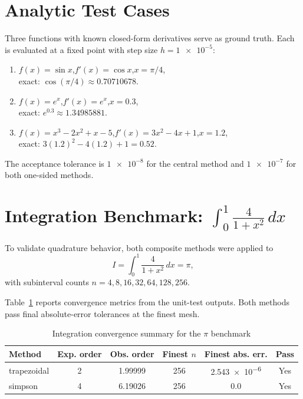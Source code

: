 \documentclass[letterpaper,twocolumn,fleqn]{article}
\begin{document}
\section{Analytic Test Cases}
Three functions with known closed-form derivatives serve as ground truth. Each is evaluated at a fixed point with step size $h=\num{1e-5}$:

\begin{enumerate}
    \item $f(x)=\sin x$,\quad $f'(x)=\cos x$,\quad $x=\pi/4$,\\
          exact: $\cos(\pi/4)\approx\num{0.70710678}$.
    \item $f(x)=e^{x}$,\quad $f'(x)=e^{x}$,\quad $x=0.3$,\\
          exact: $e^{0.3}\approx\num{1.34985881}$.
    \item $f(x)=x^{3}-2x^{2}+x-5$,\quad $f'(x)=3x^{2}-4x+1$,\quad $x=1.2$,\\
          exact: $3(1.2)^{2}-4(1.2)+1=\num{0.52}$.
\end{enumerate}

The acceptance tolerance is $\num{1e-8}$ for the central method and $\num{1e-7}$ for both one-sided methods.

\section{Integration Benchmark: $\int_0^1 \frac{4}{1+x^2}\,dx$}
To validate quadrature behavior, both composite methods were applied to
\[
I = \int_0^1 \frac{4}{1+x^2}\,dx = \pi,
\]
with subinterval counts $n=4,8,16,32,64,128,256$.

Table~\ref{tab:int-summary} reports convergence metrics from the unit-test outputs. Both methods pass final absolute-error tolerances at the finest mesh.

\begin{table}[h!]
\caption{Integration convergence summary for the $\pi$ benchmark}
\vspace{12pt}
\label{tab:int-summary}
\centering
{\small
\setlength{\tabcolsep}{3pt}
\begin{tabular}{|l|c|c|c|c|c|}
\hline
Method & Exp. order & Obs. order & Finest $n$ & Finest abs. err. & Pass \\\hline
trapezoidal & 2 & \num{1.99999} & 256 & \num{2.543e-6} & Yes \\\hline
simpson & 4 & \num{6.19026} & 256 & \num{0.0} & Yes \\\hline
\end{tabular}
}
\end{table}
\end{document}
